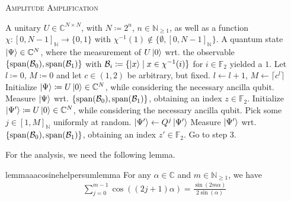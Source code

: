 {\centering\begin{minipage}{\linewidth}
    \begin{algorithm}[H]
        \caption{\textsc{Amplitude Amplification}}
        \label{amplitude_amplification}
        \begin{algorithmic}[1]
            \Require A unitary \(U \in \mathbb{C}^{N \times N}\), with \(N \coloneqq 2^n\), \(n \in \mathbb{N}_{\geq 1}\), as well as a function \(\chi\colon [0, N-1]_{\mathbb{N}} \to \{0, 1\}\) with \(\chi^{-1}(1) \notin \{\emptyset, [0, N-1]_{\mathbb{N}}\}\).
            \Ensure A quantum state \(\ket{\Psi} \in \mathbb{C}^N\), where the measurement of \(U\ket{0}\) wrt. the observable \(\{\operatorname{span}(\mathcal{B}_0), \operatorname{span}(\mathcal{B}_1)\}\) with \(\mathcal{B}_i \coloneqq \{\ket{x} \mid x \in \chi^{-1}(i)\}\) for \(i \in \mathbb{F}_2\) yielded a \(1\).
            \State Let \(l \coloneqq 0\), \(M \coloneqq 0\) and let \(c \in (1, 2)\) be arbitrary, but fixed.
                \State \(l \gets l+1\), \(M \gets \lceil c^l \rceil\)
                \State Initialize \(\ket{\Psi} \coloneqq U\ket{0} \in \mathbb{C}^N\), while considering the necessary ancilla qubit.
                \State Measure \(\ket{\Psi}\) wrt. \(\{\operatorname{span}(\mathcal{B}_0), \operatorname{span}(\mathcal{B}_1)\}\), obtaining an index \(z \in \mathbb{F}_2\). \label{aa_first_measurement}
                    \State \Return{\(\ket{\Psi}\)}
                \Else
                    \State Initialize \(\ket{\Psi'} \coloneqq U\ket{0} \in \mathbb{C}^N\), while considering the necessary ancilla qubit.
                    \State Pick some \(j \in [1, M]_{\mathbb{N}}\) uniformly at random. \label{aa_laplacian_step}
                    \State \(\ket{\Psi'} \gets Q^j\ket{\Psi'}\)
                    \State Measure \(\ket{\Psi'}\) wrt. \(\{\operatorname{span}(\mathcal{B}_0), \operatorname{span}(\mathcal{B}_1)\}\), obtaining an index \(z' \in \mathbb{F}_2\). \label{aa_second_measurement}
                    \Else
                        \State Go to step 3.
                    \EndIf
                \EndIf
            \EndWhile
        \end{algorithmic}
    \end{algorithm}
\end{minipage}\par} \phantom{}

For the analysis, we need the following lemma.

\begin{restatable}{lemma}{aacosinehelpersumlemma} \label{aa_cosine_helper_sum_lemma}
    For any \(\alpha \in \mathbb{C}\) and \(m \in \mathbb{N}_{\geq 1}\), we have
    \begin{align}
        \sum_{j=0}^{m-1} \cos((2j+1)\alpha) = \frac{\sin(2m\alpha)}{2\sin(\alpha)}
    \end{align}
\end{restatable}

